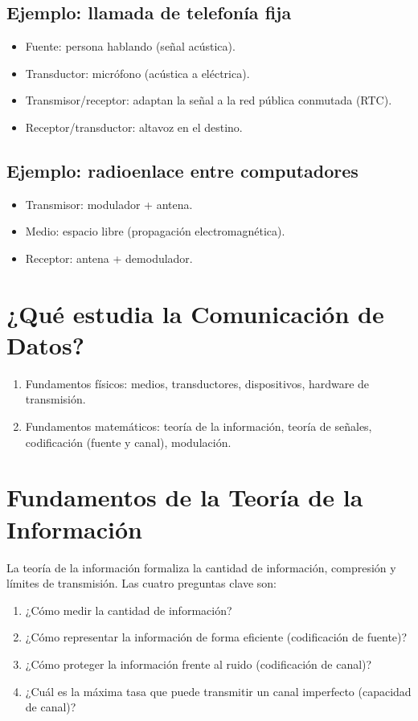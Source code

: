 \documentclass[11pt,a4paper]{article}
\begin{document}
\subsection{Ejemplo: llamada de telefonía fija}
\begin{itemize}
  \item Fuente: persona hablando (señal acústica).
  \item Transductor: micrófono (acústica a eléctrica).
  \item Transmisor/receptor: adaptan la señal a la red pública conmutada (RTC).
  \item Receptor/transductor: altavoz en el destino.
\end{itemize}

\subsection{Ejemplo: radioenlace entre computadores}
\begin{itemize}
  \item Transmisor: modulador + antena.
  \item Medio: espacio libre (propagación electromagnética).
  \item Receptor: antena + demodulador.
\end{itemize}

\section{¿Qué estudia la Comunicación de Datos?}
\begin{enumerate}
  \item Fundamentos físicos: medios, transductores, dispositivos, hardware de transmisión.
  \item Fundamentos matemáticos: teoría de la información, teoría de señales, codificación (fuente y canal), modulación.
\end{enumerate}

\section{Fundamentos de la Teoría de la Información}
La teoría de la información formaliza la cantidad de información, compresión y límites de transmisión. Las cuatro preguntas clave son:
\begin{enumerate}
  \item ¿Cómo medir la cantidad de información?
  \item ¿Cómo representar la información de forma eficiente (codificación de fuente)?
  \item ¿Cómo proteger la información frente al ruido (codificación de canal)?
  \item ¿Cuál es la máxima tasa que puede transmitir un canal imperfecto (capacidad de canal)?
\end{enumerate}
\end{document}
